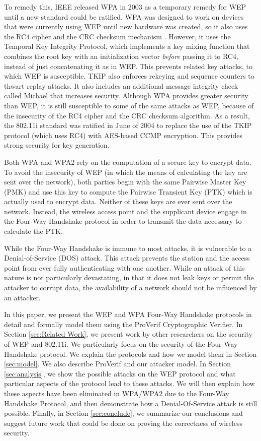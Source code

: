 \documentclass[11pt, twocolumn]{article} %
\begin{document}
To remedy this, IEEE released WPA in 2003 as a temporary remedy for WEP until a new standard could be ratified.  WPA was designed to work on devices that were currently using WEP until new hardware was created, so it also uses the RC4 cipher and the CRC checksum mechanism \cite{wpa03}.  However, it uses the Temporal Key Integrity Protocol, which implements a key mixing function that combines the root key with an initialization vector \textit{before} passing it to RC4, instead of just concatenating it as in WEP.  This prevents related key attacks, to which WEP is susceptible.  TKIP also enforces rekeying and sequence counters to thwart replay attacks.  It also includes an additional message integrity check called Michael that increases security.  Although WPA provides greater security than WEP, it is still susceptible to some of the same attacks as WEP, because of the insecurity of the RC4 cipher and the CRC checksum algorithm.  As a result, the 802.11i standard was ratified in June of 2004 to replace the use of the TKIP protocol (which uses RC4) with AES-based CCMP encryption\cite{IEEE802.11i}. This provides strong security for key generation.

Both WPA and WPA2 rely on the computation of a secure key to encrypt data.  To avoid the insecurity of WEP (in which the means of calculating the key are sent over the network), both parties begin with the same Pairwise Master Key (PMK) and use this key to compute the Pairwise Transient Key (PTK) which is actually used to encrypt data.  Neither of these keys are ever sent over the network.  Instead, the wireless access point and the supplicant device engage in the Four-Way Handshake protocol in order to transmit the data necessary to calculate the PTK.  

While the Four-Way Handshake is immune to most attacks, it is vulnerable to a Denial-of-Service (DOS) attack.  This attack prevents the station and the access point from ever fully authenticating with one another.  While an attack of this nature is not particularly devastating, in that it does not leak keys or permit the attacker to corrupt data, the availability of a network should not be influenced by an attacker.

In this paper, we present the WEP and WPA Four-Way Handshake protocols in detail and formally model them using the ProVerif Cryptographic Verifier. In Section \ref{sec:Related Work}, we present work by other researchers on the security of WEP and 802.11i.  We particularly focus on the security of the Four-Way Handshake protocol.  We explain the protocols and how we model them in Section \ref{sec:model}.  We also describe ProVerif and our attacker model.  In Section \ref{sec:analysis}, we show the possible attacks on the WEP protocol and what particular aspects of the protocol lead to these attacks.  We will then explain how these aspects have been eliminated in WPA/WPA2 due to the Four-Way Handshake Protocol, and then demonstrate how a Denial-Of-Service attack is still possible.  Finally, in Section \ref{sec:conclude}, we summarize our conclusions and suggest future work that could be done on proving the correctness of wireless security.
\end{document}
